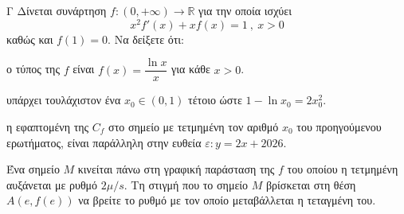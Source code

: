 \begin{thema}{Γ}
Δίνεται συνάρτηση $f:(0,+\infty)\to\mathbb{R}$ για την οποία ισχύει
\[ x^2f'(x)+xf(x)=1\ , \ x>0 \]
καθώς και $f(1)=0$. Να δείξετε ότι:
\begin{erwthma}
\item ο τύπος της $f$ είναι $f(x)=\dfrac{\ln{x}}{x}$ για κάθε $ x>0$.
\item υπάρχει τουλάχιστον ένα $x_0\in(0,1)$ τέτοιο ώστε $1-\ln{x_0}=2x_0^2$.

\item η εφαπτομένη της $C_f$ στο σημείο με τετμημένη τον αριθμό $x_0$ του προηγούμενου ερωτήματος, είναι παράλληλη στην ευθεία $\varepsilon: y = 2x + 2026$.
\item Ένα σημείο $M$ κινείται πάνω στη γραφική παράσταση της $f$ του οποίου η τετμημένη αυξάνεται με ρυθμό $2\mu/s$. Τη στιγμή που το σημείο $M$ βρίσκεται στη θέση $A(e,f(e))$ να βρείτε το ρυθμό με τον οποίο μεταβάλλεται η τεταγμένη του.
\end{erwthma}
\end{thema}
